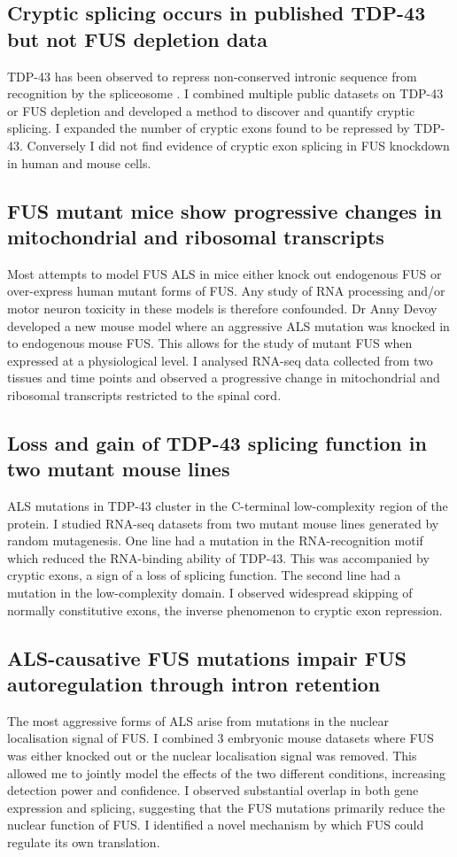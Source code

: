 \subsection{Cryptic splicing occurs in published TDP-43 but not FUS depletion data}
TDP-43 has been observed to repress non-conserved intronic sequence from recognition by the spliceosome \citep{Ling2015}. 
I combined multiple public datasets on TDP-43 or FUS depletion and developed a method to discover and quantify cryptic splicing.
I expanded the number of cryptic exons found to be repressed by TDP-43. 
Conversely I did not find evidence of cryptic exon splicing in FUS knockdown in human and mouse cells.

\subsection{FUS mutant mice show progressive changes in mitochondrial and ribosomal transcripts}
Most attempts to model FUS ALS in mice either knock out endogenous FUS or over-express human mutant forms of FUS. 
Any study of RNA processing and/or motor neuron toxicity in these models is therefore confounded.
Dr Anny Devoy developed a new mouse model where an aggressive ALS mutation was knocked in to endogenous mouse FUS. 
This allows for the study of mutant FUS when expressed at a physiological level. 
I analysed RNA-seq data collected from two tissues and time points and observed a progressive change in mitochondrial and ribosomal transcripts restricted to the spinal cord.

\subsection{Loss and gain of TDP-43 splicing function in two mutant mouse lines}
ALS mutations in TDP-43 cluster in the C-terminal low-complexity region of the protein.
I studied RNA-seq datasets from two mutant mouse lines generated by random mutagenesis. 
One line had a mutation in the RNA-recognition motif which reduced the RNA-binding ability of TDP-43.
This was accompanied by cryptic exons, a sign of a loss of splicing function.
The second line had a mutation in the low-complexity domain.
I observed widespread skipping of normally constitutive exons, the inverse phenomenon to cryptic exon repression.

\subsection{ALS-causative FUS mutations impair FUS autoregulation through intron retention}
The most aggressive forms of ALS arise from mutations in the nuclear localisation signal of FUS.
I combined 3 embryonic mouse datasets where FUS was either knocked out or the nuclear localisation signal was removed.
This allowed me to jointly model the effects of the two different conditions, increasing detection power and confidence.
I observed substantial overlap in both gene expression and splicing, suggesting that the FUS mutations primarily reduce the nuclear function of FUS.
I identified a novel mechanism by which FUS could regulate its own translation.



